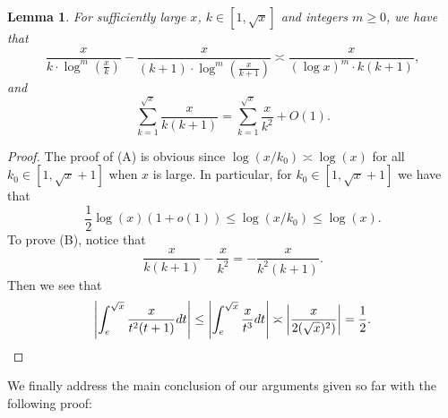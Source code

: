 \documentclass[11pt,reqno,a4letter]{article}
\numberwithin{figure}{section}
\numberwithin{table}{section}
\theoremstyle{plain}
\newtheorem{lemma}[theorem]{Lemma}
\numberwithin{theorem}{section}
\theoremstyle{definition}
\begin{document}
\begin{lemma}
\label{lemma_PrimePix_ErrorBoundDiffs_SimplifyingConditions_v1} 
For sufficiently large $x$, $k \in [1, \sqrt{x}]$ and integers $m \geq 0$, we have that 
\begin{equation} 
\tag{A} 
\frac{x}{k \cdot \log^m\left(\frac{x}{k}\right)} - \frac{x}{(k+1) \cdot \log^m\left(\frac{x}{k+1}\right)}
     \asymp \frac{x}{(\log x)^m \cdot k(k+1)}, 
\end{equation} 
and 
\begin{equation} 
\tag{B} 
\sum_{k=1}^{\sqrt{x}} \frac{x}{k(k+1)} = \sum_{k=1}^{\sqrt{x}} \frac{x}{k^2} + O(1). 
\end{equation} 
\end{lemma} 
\begin{proof} 
The proof of (A) is obvious since $\log(x/k_0) \asymp \log(x)$ for all $k_0 \in [1, \sqrt{x} + 1]$ when $x$ is 
large. In particular, for $k_0 \in [1, \sqrt{x} + 1]$ we have that 
\[
\frac{1}{2}\log(x) (1 + o(1)) \leq \log(x/k_0) \leq \log(x). 
\]
To prove (B), notice that 
\[
\frac{x}{k(k+1)} - \frac{x}{k^2} = -\frac{x}{k^2(k+1)}. 
\]
Then we see that 
\[
\left\lvert \int_e^{\sqrt{x}} \frac{x}{t^2(t+1)} dt \right\rvert \leq 
     \left\lvert \int_e^{\sqrt{x}} \frac{x}{t^3} dt \right\rvert \asymp 
     \left\lvert \frac{x}{2 (\sqrt{x})^2)} \right\rvert = \frac{1}{2}. 
     \qedhere 
\]
\end{proof} 

We finally address the main conclusion of our arguments given so far with the 
following proof: 
\end{document}
